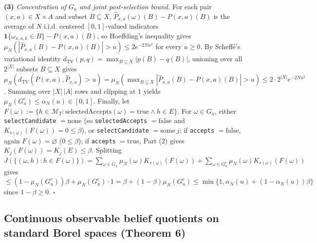 \documentclass[11pt,a4paper]{article}
\newcounter{none}
\begin{document}
\textbf{(3)} \emph{Concentration of \(G_u\) and joint post-selection
bound.} For each pair \((x,a) \in X \times A\) and subset
\(B \subseteq X\), \(\widehat{P}_{x,a}(\omega)(B) - P(x,a)(B)\) is the
average of \(N\) i.i.d. centered \([0,1]\)-valued indicators
\(\mathbf{1}\{\omega_{x,a,k} \in B\} - P(x,a)(B)\), so Hoeffding's
inequality \citep{hoeffding1963} gives
\(\mu_N(|\widehat{P}_{x,a}(B) - P(x,a)(B)| > u) \le 2 e^{-2Nu^2}\) for
every \(u \ge 0\). By Scheffé's variational identity
\(d_{\mathrm{TV}}(p, q) = \max_{B \subseteq X} |p(B) - q(B)|\), unioning
over all \(2^{|X|}\) subsets \(B \subseteq X\) gives
\(\mu_N(d_{\mathrm{TV}}(P(x,a), \widehat{P}_{x,a}) > u) = \mu_N(\max_{B \subseteq X} |\widehat{P}_{x,a}(B) - P(x,a)(B)| > u) \le 2 \cdot 2^{|X|} e^{-2Nu^2}\).
Summing over \(|X|\,|A|\) rows and clipping at \(1\) yields
\(\mu_N(G_u^c) \le \alpha_N(u) \in [0,1]\). Finally, let
\(F(\omega) := \{h \in \mathcal{M}_T : \mathrm{selectedAccepts}(\omega) = \mathrm{true} \land h \in E\}\).
For \(\omega \in G_u\), either \texttt{selectCandidate}
\(= \mathrm{none}\) (so \texttt{selectedAccepts} \(= \mathrm{false}\)
and \(K_{s(\omega)}(F(\omega)) = 0 \le \beta\)), or
\texttt{selectCandidate} \(= \mathrm{some}\ j\): if \texttt{accepts}
\(= \mathrm{false}\), again \(F(\omega) = \varnothing\)
(\(0 \le \beta\)); if \texttt{accepts} \(= \mathrm{true}\), Part (2)
gives \(K_j(F(\omega)) = K_j(E) \le \beta\). Splitting
\(J(\{(\omega, h) : h \in F(\omega)\}) = \sum_{\omega \in G_u} \mu_N(\omega) K_{s(\omega)}(F(\omega)) + \sum_{\omega \in G_u^c} \mu_N(\omega) K_{s(\omega)}(F(\omega))\)
gives
\(\le (1 - \mu_N(G_u^c))\beta + \mu_N(G_u^c) \cdot 1 = \beta + (1 - \beta)\mu_N(G_u^c) \le \min\{1, \alpha_N(u) + (1 - \alpha_N(u))\beta\}\)
since \(1 - \beta \ge 0\). \(\square\)

\subsection{Continuous observable belief quotients on standard Borel
spaces (Theorem
6)}\label{continuous-observable-belief-quotients-on-standard-borel-spaces-theorem-6}
\end{document}
